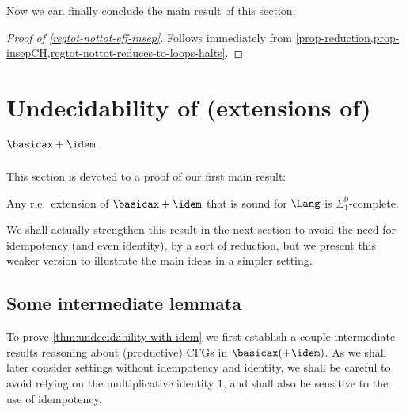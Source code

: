 \documentclass[runningheads]{amsart}
\begin{document}
Now we can finally conclude the main result of this section:
\begin{proof}
    [Proof of \cref{regtot-nottot-eff-insep}]
    Follows immediately from \cref{prop-reduction,prop-insepCH,regtot-nottot-reduces-to-loops-halts}.
\end{proof}




\section{Undecidability of (extensions of) $\basicax + \idem$ }
\label{sec:undec-with-idem}

This section is devoted to a proof of our first main result:

\begin{theorem}
\label{thm:undecidability-with-idem}
    Any r.e.\ extension of $\basicax + \idem$ that is sound for $\Lang$ is $\Sigma^0_1$-complete.
\end{theorem}

We shall actually strengthen this result in the next section to avoid the need for idempotency (and even identity), by a sort of reduction, but we present this weaker version to illustrate the main ideas in a simpler setting.


\subsection{Some intermediate lemmata}

To prove \cref{thm:undecidability-with-idem} we first establish a couple intermediate results reasoning about (productive) CFGs in $\basicax (+ \idem)$.
As we shall later consider settings without idempotency and identity, we shall be careful to avoid relying on the multiplicative identity $1$, and shall also be sensitive to the use of idempotency.
\end{document}
